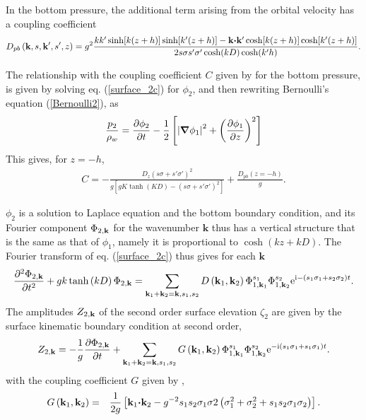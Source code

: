 In the bottom pressure, the additional term arising from the orbital velocity has a coupling coefficient
\begin{eqnarray}
 D_{pb} \left(\mathbf{k},s,\mathbf{k^{\prime}},s',z\right)  = 
    g^2 \frac{k k' \sinh[k(z+h)]\sinh[k'(z+h)] -  \mathbf{k} \mbox{\boldmath $\cdot$} \mathbf{k^{\prime}}  \cosh[k(z+h)]\cosh[k'(z+h)]}
{2 s \sigma s' \sigma' \cosh(kD) \cosh(k'h)}. \nonumber \\  \label{Dpb}
\end{eqnarray}

The relationship with the coupling coefficient $C$ given by \citet[][their eq. 4]{Herbers&Guza1991} for the bottom pressure,
is given by solving eq. (\ref{surface_2c}) for $\phi_2$, and then rewriting Bernoulli's equation (\ref{Bernoulli2}), as 
\begin{equation}
  \frac{p_2}{\rho_w} = \frac{\partial \phi_2}{\partial t} 
                         - \frac{1}{2}\left[
                                            \left|\mbox{\boldmath $\nabla$} \phi_1\right|^2
                                         +\left(\frac{\partial \phi_1}{\partial z}\right)^2\right]
\label{Bernoulli21}
\end{equation}
This gives, for $z=-h$,  
 \begin{eqnarray}
 C=-\frac{D_z(s\sigma + s' \sigma')^2 }{g \left[ g K \tanh(KD) - (s \sigma + s' \sigma')^2 \right]} +  \frac{D_{pb}(z=-h)}{g}. 
 \end{eqnarray}

$\phi_2$ is a solution to  Laplace equation and the bottom boundary condition, and its Fourier component $\Phi _{2,\mathbf{k}}$ for the wavenumber $\mathbf{k}$ 
thus has a vertical structure that is the same as that of  $\phi_1$, namely it is proportional to $\cosh\left(kz+kD\right)$. The Fourier 
transform of eq. (\ref{surface_2c}) thus gives for each ${\mathbf k}$
\begin{equation}
\frac{\partial ^{2}\Phi _{2,\mathbf{k}}}{\partial t^{2}}
    +gk\tanh\left(kD\right) \Phi _{2,\mathbf{k}}
    =\sum_{{\mathbf k_1}+{\mathbf k_2}=\mathbf{k},s_1,s_2}
     D\left({\mathbf k_1},{\mathbf k_2}\right)
    \Phi _{1,\mathbf{k}_1}^{s_1}\Phi _{1,\mathbf{k}_2}^{s_2} \mathrm{e}^{\mathrm{i}
     - \left(s_1 \sigma_1+s_2 \sigma_2  \right) t}.\label{surface 2c}
\end{equation}
The amplitudes $Z_{2,\mathbf{k}}$ of the second order surface elevation $\zeta_2$ are given by the surface 
kinematic boundary condition at second order,
\begin{equation}
Z_{2,\mathbf{k}}=-\frac{1}{g} \frac{\partial \Phi _{2,{\mathbf
k}}}{\partial t}
    +\sum_{{\mathbf k_1}+{\mathbf k_2}=\mathbf{k},s_1,s_2}
     G\left({\mathbf k_1},{\mathbf k_2}\right)
    \Phi _{1,\mathbf{k}_1}^{s_1}\Phi _{1,\mathbf{k}_2}^{s_2} \mathrm{e}^{-\mathrm{i}
    \left(s_1 \sigma_1+s_1 \sigma_1 \right) t
    }.\label{Snl}
\end{equation}
with the coupling coefficient $G$ given by \cite{Hasselmann1962},
\begin{eqnarray}
    G\left({\mathbf k_1},{\mathbf k_2}\right) & = &
    \frac{1}{2g}\left[\mathbf{k}_1 \mbox{\boldmath $\cdot$} \mathbf{k}_2
    -g^{-2} s_1 s_2 \sigma_1 \sigma2\left(\sigma_1^2+\sigma_2^2+ s_1 s_2 \sigma_1 \sigma_2\right)\right]
    .
\end{eqnarray}



